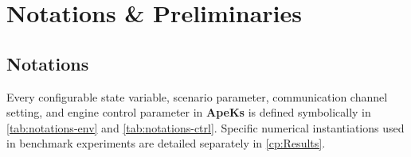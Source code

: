 \documentclass[11pt,a4paper,oneside]{report}
\begin{document}
\chapter[Preliminaries]{Notations \& Preliminaries}
\label{cp:notations}

\parindent0pt

\section{Notations}
Every configurable state variable, scenario parameter, communication channel setting, and engine control parameter in \textbf{ApeKs} is defined symbolically in \autoref{tab:notations-env} and \autoref{tab:notations-ctrl}. Specific numerical instantiations used in benchmark experiments are detailed separately in \autoref{cp:Results}.
\end{document}
